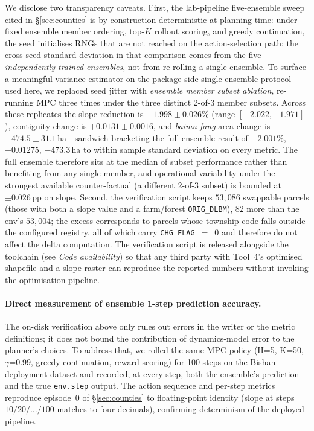 \documentclass[11pt]{article}
\begin{document}
We disclose two transparency caveats. First, the lab-pipeline five-ensemble sweep cited in \S\ref{sec:counties} is by construction deterministic at planning time: under fixed ensemble member ordering, top-$K$ rollout scoring, and greedy continuation, the seed initialises RNGs that are not reached on the action-selection path; the cross-seed standard deviation in that comparison comes from the five \emph{independently trained ensembles}, not from re-rolling a single ensemble. To surface a meaningful variance estimator on the package-side single-ensemble protocol used here, we replaced seed jitter with \emph{ensemble member subset ablation}, re-running MPC three times under the three distinct 2-of-3 member subsets. Across these replicates the slope reduction is $-1.998 \pm 0.026\%$ (range $[-2.022, -1.971]$), contiguity change is $+0.0131 \pm 0.0016$, and \textit{baimu fang} area change is $-474.5 \pm 31.1$\,ha---sandwich-bracketing the full-ensemble result of $-2.001\%$, $+0.01275$, $-473.3$\,ha to within sample standard deviation on every metric. The full ensemble therefore sits at the median of subset performance rather than benefiting from any single member, and operational variability under the strongest available counter-factual (a different 2-of-3 subset) is bounded at $\pm 0.026$\,pp on slope. Second, the verification script keeps $53{,}086$ swappable parcels (those with both a slope value and a farm/forest \texttt{ORIG\_DLBM}), $82$ more than the env's $53{,}004$; the excess corresponds to parcels whose township code falls outside the configured registry, all of which carry \texttt{CHG\_FLAG}~$=$~$0$ and therefore do not affect the delta computation. The verification script is released alongside the toolchain (see \emph{Code availability}) so that any third party with Tool~4's optimised shapefile and a slope raster can reproduce the reported numbers without invoking the optimisation pipeline.

\paragraph{Direct measurement of ensemble 1-step prediction accuracy.}\label{sec:methods-mae}

The on-disk verification above only rules out errors in the writer or the metric definitions; it does not bound the contribution of dynamics-model error to the planner's choices. To address that, we rolled the same MPC policy (H=5, K=50, $\gamma$=0.99, greedy continuation, reward scoring) for 100 steps on the Bishan deployment dataset and recorded, at every step, both the ensemble's prediction and the true \texttt{env.step} output. The action sequence and per-step metrics reproduce episode~0 of \S\ref{sec:counties} to floating-point identity (slope at steps $10/20/\dots/100$ matches to four decimals), confirming determinism of the deployed pipeline.
\end{document}
